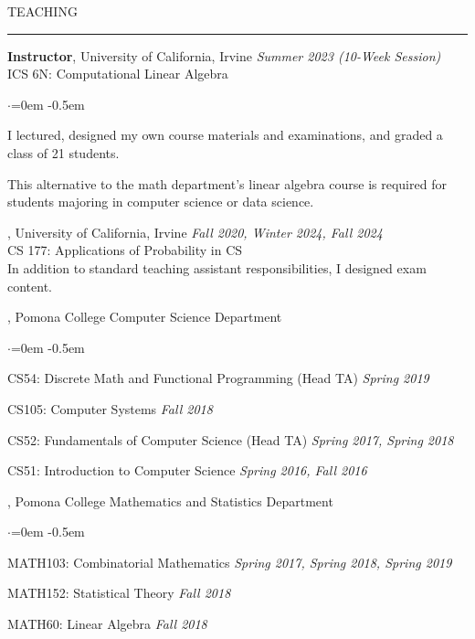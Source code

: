 \documentclass{resume} %
\renewenvironment{rSection}[1]{
\sectionskip
\textcolor{CarnegieMellonRed}{\MakeUppercase{#1}}
\sectionlineskip
\hrule
\begin{list}{}{
\setlength{\leftmargin}{1.5em}
}
\item[]
}{
\end{list}
}
\begin{document}
\begin{rSection}{Teaching}

{\bf Instructor}, University of California, Irvine \hfill {\em Summer 2023 (10-Week Session)}\\
ICS 6N: Computational Linear Algebra
\begin{list}{$\cdot$}{\leftmargin=0em} 
    \itemsep -0.5em \vspace{-0.5em}
      \item I lectured, designed my own course materials and examinations, and graded a class of 21 students.
      \item This alternative to the math department's linear algebra course is required for students majoring in computer science or data science.
  \end{list}
  \vspace{1.em}

 , University of California, Irvine \hfill {\em Fall 2020, Winter 2024, Fall 2024}\\
 CS 177: Applications of Probability in CS\\
 In addition to standard teaching assistant responsibilities, I designed exam content. 
  \vspace{1.em}

 , Pomona College Computer Science Department
\begin{list}{$\cdot$}{\leftmargin=0em}
    \itemsep -0.5em \vspace{-0.5em}
      \item CS54: Discrete Math and Functional Programming (Head TA) \hfill {\em Spring 2019}
      \item CS105: Computer Systems \hfill {\em Fall 2018}
      \item CS52: Fundamentals of Computer Science (Head TA) \hfill {\em Spring 2017, Spring 2018}
      \item CS51: Introduction to Computer Science \hfill {\em Spring 2016, Fall 2016}
  \end{list}
  \vspace{1.em}

 , Pomona College Mathematics and Statistics Department
\begin{list}{$\cdot$}{\leftmargin=0em}
    \itemsep -0.5em \vspace{-0.5em}
      \item MATH103: Combinatorial Mathematics \hfill {\em Spring 2017, Spring 2018, Spring 2019}
      \item MATH152: Statistical Theory \hfill {\em Fall 2018}
      \item MATH60: Linear Algebra \hfill {\em Fall 2018}
  \end{list}
  \vspace{0.5em}

\newpage 
\end{rSection}
\end{document}

